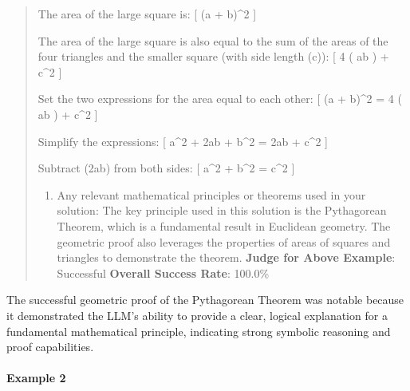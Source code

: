 \documentclass[fleqn,10pt]{wlscirep}
\providecommand{\tightlist}{%
  \setlength{\itemsep}{0pt}\setlength{\parskip}{0pt}}
\begin{document}
\begin{quote}
The area of the large square is: {[} (a + b)\^{}2 {]}

The area of the large square is also equal to the sum of the areas of
the four triangles and the smaller square (with side length (c)): {[} 4
\left( ab \right) + c\^{}2 {]}

Set the two expressions for the area equal to each other: {[} (a +
b)\^{}2 = 4 \left( ab \right) + c\^{}2 {]}

Simplify the expressions: {[} a\^{}2 + 2ab + b\^{}2 = 2ab + c\^{}2 {]}

Subtract (2ab) from both sides: {[} a\^{}2 + b\^{}2 = c\^{}2 {]}

\begin{enumerate}
\def\labelenumi{\arabic{enumi}.}
\setcounter{enumi}{2}
\tightlist
\item
  Any relevant mathematical principles or theorems used in your
  solution: The key principle used in this solution is the Pythagorean
  Theorem, which is a fundamental result in Euclidean geometry. The
  geometric proof also leverages the properties of areas of squares and
  triangles to demonstrate the theorem. \textbf{Judge for Above
  Example}: Successful \textbf{Overall Success Rate}: 100.0\%
\end{enumerate}
\end{quote}

The successful geometric proof of the Pythagorean Theorem was notable
because it demonstrated the LLM's ability to provide a clear, logical
explanation for a fundamental mathematical principle, indicating strong
symbolic reasoning and proof capabilities.

\hypertarget{example-2-17}{%
\paragraph{Example 2}\label{example-2-17}}
\end{document}
